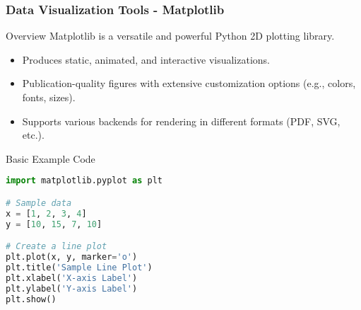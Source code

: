 \documentclass[aspectratio=169]{beamer}
\begin{document}
\begin{frame}[fragile]
    \frametitle{Data Visualization Tools - Matplotlib}
    
    \begin{block}{Overview}
        Matplotlib is a versatile and powerful Python 2D plotting library.
    \end{block}
    
    \begin{itemize}
        \item Produces static, animated, and interactive visualizations.
        \item Publication-quality figures with extensive customization options (e.g., colors, fonts, sizes).
        \item Supports various backends for rendering in different formats (PDF, SVG, etc.).
    \end{itemize}
    
    \begin{block}{Basic Example Code}
        \begin{lstlisting}[language=Python]
import matplotlib.pyplot as plt

# Sample data
x = [1, 2, 3, 4]
y = [10, 15, 7, 10]

# Create a line plot
plt.plot(x, y, marker='o')
plt.title('Sample Line Plot')
plt.xlabel('X-axis Label')
plt.ylabel('Y-axis Label')
plt.show()
        \end{lstlisting}
    \end{block}
\end{frame}
\end{document}
